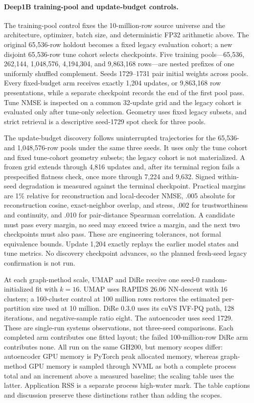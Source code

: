 \documentclass[10pt]{article}
\begin{document}
\paragraph{Deep1B training-pool and update-budget controls.}
The training-pool control fixes the 10-million-row source universe and the architecture,
optimizer, batch size, and deterministic FP32 arithmetic above.  The original 65,536-row
holdout becomes a fixed legacy evaluation cohort; a new disjoint 65,536-row tune cohort
selects checkpoints.  Five training pools---65,536, 262,144, 1,048,576, 4,194,304, and
9,863,168 rows---are nested prefixes of one uniformly shuffled complement.  Seeds
1729--1731 pair initial weights across pools.  Every fixed-budget arm receives exactly
1,204 updates, or 9,863,168 row presentations, while a separate checkpoint records the
end of the first pool pass.  Tune NMSE is inspected on a common 32-update grid and the
legacy cohort is evaluated only after tune-only selection.  Geometry uses fixed legacy
subsets, and strict retrieval is a descriptive seed-1729 spot check for three pools.

The update-budget discovery follows uninterrupted trajectories for the 65,536- and
1,048,576-row pools under the same three seeds.  It uses only the tune cohort and fixed
tune-cohort geometry subsets; the legacy cohort is not materialized.  A frozen grid
extends through 4,816 updates and, after its terminal region fails a prespecified
flatness check, once more through 7,224 and 9,632.  Signed within-seed degradation is
measured against the terminal checkpoint.  Practical margins are 1\% relative for
reconstruction and local-decoder NMSE, .005 absolute for reconstruction cosine,
exact-neighbor overlap,
and stress, .002 for trustworthiness and continuity, and .010 for pair-distance
Spearman correlation.  A candidate must pass every margin, no seed may exceed twice a
margin, and the next two checkpoints must also pass.  These are engineering tolerances,
not formal equivalence bounds.  Update 1,204 exactly replays the earlier model states and
tune metrics.  No discovery checkpoint advances, so the planned fresh-seed legacy
confirmation is not run.

At each graph-method scale, UMAP and DiRe receive one seed-0 random-initialized fit with
$k=16$.  UMAP uses RAPIDS 26.06 NN-descent with 16 clusters; a 160-cluster control at
100 million rows restores the estimated per-partition size used at 10 million.  DiRe
0.3.0 uses its cuVS IVF-PQ path, 128 iterations, and negative-sample ratio eight.  The
autoencoder uses seed 1729.  These are single-run systems observations, not three-seed
comparisons.  Each completed arm contributes one fitted layout; the failed
100-million-row DiRe arm contributes none.  All run on the same GH200, but memory scopes
differ: autoencoder GPU memory is PyTorch
peak allocated memory, whereas graph-method GPU memory is sampled through NVML as both
a complete process total and an increment above a measured baseline; the scaling table
uses the latter.  Application RSS is a separate process high-water mark.  The table
captions and discussion preserve these distinctions rather than adding the scopes.
\end{document}
